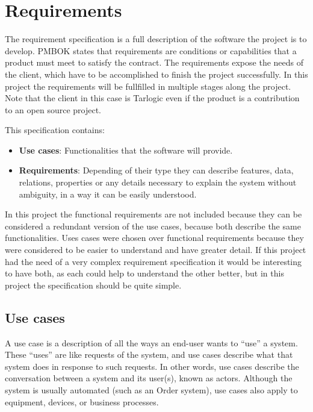 \chapter{Requirements}



The requirement specification is a full description of the software the project is to develop.
\linej
PMBOK\cite{pmbok} states that requirements are conditions or capabilities that a product must meet to satisfy the contract.
The requirements expose the needs of the client, which have to be accomplished to finish the project successfully.
In this project the requirements will be fullfilled in multiple stages along the project.
\linej
Note that the client in this case is Tarlogic even if the product is a contribution to an open source project.

\linej
\linej
This specification contains:
\begin{itemize}
	\item \textbf{Use cases}: Functionalities that the software will provide.
	\item \textbf{Requirements}: Depending of their type they can describe features, data, relations, properties or any details necessary to explain the system without ambiguity, in a way it can be easily understood.
\end{itemize}

In this project the functional requirements are not included because they can be considered a redundant version of the use cases, because both describe the same functionalities.
Uses cases were chosen over functional requirements because they were considered to be easier to understand and have greater detail. If this project had the need of a very complex requirement specification it would be interesting to have both, as each could help to understand the other better, but in this project the specification should be quite simple.






\section{Use cases}
A use case is a description of all the ways an end-user wants to ``use'' a system. These ``uses'' are like requests of the system, and use cases describe what that system does in response to such requests. In other words, use cases describe the conversation between a system and its user(s), known as actors. Although the system is usually automated (such as an Order system), use cases also apply to equipment, devices, or business processes.\cite{use_case_definition}


